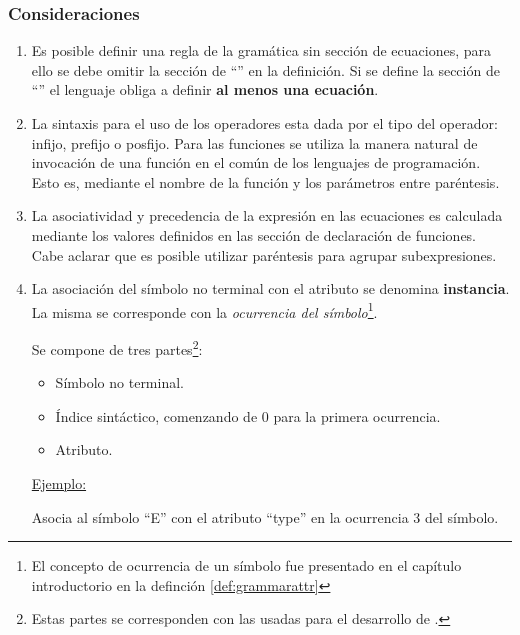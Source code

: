 \subsubsection*{Consideraciones}
\label{subsec:consirule}
\begin{enumerate}
\item Es posible definir una regla de la gramática sin sección de ecuaciones, para ello se debe omitir la sección de ``'' en la definición. Si se define la sección de ``'' el lenguaje obliga a definir \textbf{al menos una ecuación}.

\item La sintaxis para el uso de los operadores esta dada por el tipo del operador: infijo, prefijo o posfijo. Para las funciones se utiliza la manera natural de invocación de una función en el común de los lenguajes de programación. Esto es, mediante el nombre de la función y los parámetros entre paréntesis.

\item La asociatividad y precedencia de la expresión en las ecuaciones es calculada mediante los valores definidos en las sección de declaración de funciones. Cabe aclarar que es posible utilizar paréntesis para agrupar subexpresiones.

\item La asociación del símbolo no terminal con el atributo se denomina \textbf{instancia}. La misma se corresponde con la \textit{ocurrencia del símbolo}\footnote{El concepto de ocurrencia de un símbolo fue presentado en el capítulo introductorio en la definción \ref{def:grammarattr}}. 

Se compone de tres partes\footnote{Estas partes se corresponden con las usadas para el desarrollo de \maggen.}:
\begin{itemize}
\item Símbolo no terminal.
\item Índice sintáctico, comenzando de 0 para la primera ocurrencia.
\item Atributo.
\end{itemize}
\underline{Ejemplo:}
\vspace{0.2cm}
\begin{center}
\end{center} 

Asocia al símbolo ``E'' con el atributo ``type'' en la ocurrencia 3 del símbolo.

\end{enumerate}

